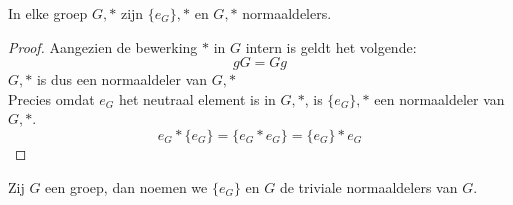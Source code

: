 \documentclass[main.tex]{subfiles}
\begin{document}
\begin{st}
  In elke groep $G,*$ zijn $\{e_{G}\},*$ en $G,*$ normaaldelers.
  
  \begin{proof}
    Aangezien de bewerking $*$ in $G$ intern is geldt het volgende:
    \[ gG = Gg \]
    $G,*$ is dus een normaaldeler van $G,*$\\
    Precies omdat $e_{G}$ het neutraal element is in $G,*$, is $\{e_{G}\},*$ een normaaldeler van $G,*$.
    \[ e_G*\{e_{G}\} = \{e_{G} * e_{G}\} = \{e_{G}\}*e_{G} \]
  \end{proof}
\end{st}

\begin{de}
  Zij $G$ een groep, dan noemen we $\{e_{G}\}$ en $G$ de triviale normaaldelers van $G$.
\end{de}
\end{document}
